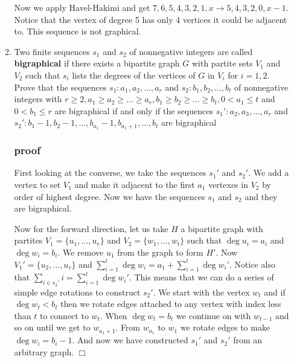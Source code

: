 \documentclass[letterpaper]{article}
\begin{document}
\begin{enumerate}
\begin{enumerate}
  Now we apply Havel-Hakimi and get $7,6,5,4,3,2,1,x\to5,4,3,2,0,x-1$. Notice that the vertex of degree 5 has only 4 vertices it could be adjacent to. This sequence is not graphical.
  \setcounter{enumii}{14}
  \item
  Two finite sequences $s_1$ and $s_2$ of nonnegative integers are called {\bfseries bigraphical} if there exists a bipartite graph $G$ with partite sets $V_1$ and $V_2$ such that $s_i$ lists the degrees of the vertices of $G$ in $V_i$ for $i=1,2$. Prove that the sequences $s_1:a_1,a_2,\dots,a_r$ and $s_2:b_1,b_2,\dots,b_t$ of nonnegative integers with $r\ge 2, a_1\ge a_2\ge\dots\ge a_r, b_1\ge b_2\ge\dots\ge b_t, 0<a_1\le t$ and $0<b_1\le r$ are bigraphical if and only if the sequences $s_1':a_2,a_3,\dots,a_r$ and $s_2':b_1-1,b_2-1,\dots,b_{a_1}-1,b_{a_1+1},\dots,b_t$ are bigraphical

  \subsubsection*{proof}
  First looking at the converse, we take the sequences $s_1'$ and $s_2'$. We add a vertex to set $V_1$ and make it adjacent to the first $a_1$ vertexes in $V_2$ by order of highest degree. Now we have the sequences $s_1$ and $s_2$ and they are bigraphical.

Now for the forward direction, let us take $H$ a bipartite graph with partites $V_1=\{u_1,\dots,u_r\}$ and $V_2=\{w_1,\dots,w_t\}$ such that $\deg u_i=a_i$ and $\deg w_i=b_i$. We remove $u_1$ from the graph to form $H'$. Now $V_1'=\{u_2,\dots,u_r\}$ and $\sum\limits_{i=1}^t{\deg w_i}=a_1+\sum\limits_{i=1}^t{\deg w_i'}$. Notice also that $\sum\limits_{i\in s_2' }{i}=\sum\limits_{i=1}^t{\deg w_i'}$. This means that we can do a series of simple edge rotations to construct $s_2'$. We start with the vertex $w_t$ and if $\deg w_t < b_t$ then we rotate edges attached to any vertex with index less than $t$ to connect to $w_t$. When $\deg w_t=b_t$ we continue on with $w_{t-1}$ and so on until we get to $w_{a_1+1}$. From $w_{a_1}$ to $w_1$ we rotate edges to make $\deg w_i=b_i-1$. And now we have constructed $s_1'$ and $s_2'$ from an arbitrary graph. $\Box$


  \end{enumerate}
\end{enumerate}
\end{document}
